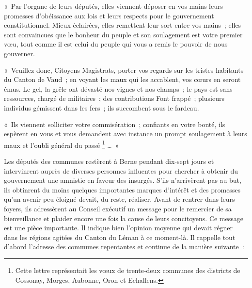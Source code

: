 \documentclass[french,twoside]{book} %
\newenvironment{quoteblock}%
  {\begin{quoting}}
  {\end{quoting}}
\newenvironment{quotebar}{%
    \def\FrameCommand{{\color{rubric!10!}\vrule width 0.5em} \hspace{0.9em}}%
    \def\OuterFrameSep{\itemsep} %
    \MakeFramed {\advance\hsize-\width \FrameRestore}
  }%
  {%
    \endMakeFramed
  }
\renewenvironment{quoteblock}%
  {%
    \savenotes
    \setstretch{0.9}
    \normalfont
    \begin{quotebar}
  }
  {%
    \end{quotebar}
    \spewnotes
  }
\begin{document}
\begin{quoteblock}
 \noindent « Par l’organe de leurs députés, elles viennent déposer en vos mains leurs promesses d’obéissance aux lois et leurs respects pour le gouvernement constitutionnel. Mieux éclairées, elles remettent leur sort entre vos mains ; elles sont convaincues que le bonheur du peuple et son soulagement est votre premier vœu, tout comme il est celui du peuple qui vous a remis le pouvoir de nous gouverner.\par
 « Veuillez donc, Citoyens Magistrats, porter vos regards sur les tristes habitants du Canton de Vaud ; en voyant les maux qui les accablent, vos cœurs en seront émus. Le gel, la grêle ont dévasté nos vignes et nos champs ; le pays est sans ressources, chargé de militaires ; des contributions Font frappé ; plusieurs individus gémissent dans les fers ; ils succombent sous le fardeau.\par
 « Ils viennent solliciter votre commisération ; confiants en votre bonté, ils espèrent en vous et vous demandent avec instance un prompt soulagement à leurs maux et l’oubli général du passé \footnote{Cette lettre représentait les vœux de trente-deux communes des districts de Cossonay, Morges, Aubonne, Oron et Eehallens.} … »
 \end{quoteblock}

\noindent Les députés des communes restèrent à Berne pendant dix-sept jours et intervinrent auprès de diverses personnes influentes pour chercher à obtenir du gouvernement une amnistie en faveur des insurgés. S’ils n’arrivèrent pas au but, ils obtinrent du moins quelques importantes marques d’intérêt et des promesses qu’un avenir peu éloigné devait, du reste, réaliser. Avant de rentrer dans leurs foyers, ils adressèrent au Conseil exécutif un message pour le remercier de sa bienveillance et plaider encore une fois la cause de leurs concitoyens. Ce message est une pièce importante. Il indique bien l’opinion moyenne qui devait régner dans les régions agitées du Canton du Léman à ce moment-là. Il rappelle tout d’abord l’adresse des communes repentantes et continue de la manière suivante :\par
\end{document}
